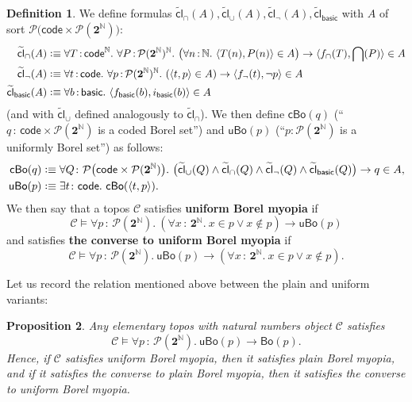 \documentclass[11pt]{amsart}
\newcommand\basic{\mathsf{basic}}
\newcommand\Bo{\mathsf{Bo}}
\newcommand\br[1]{\langle{}#1\rangle{}}
\newcommand\cBo{\mathsf{cBo}}
\newcommand\cC{\mathcal{C}}
\newcommand\cl{\mathsf{cl}}
\newcommand\code{\mathsf{code}}
\newcommand\defequiv{\mathrel{\vcenter{\baselineskip0.7ex \lineskiplimit0pt \hbox{.}\hbox{.}}} \equiv}
\newcommand\defword[1]{\textbf{#1}}
\newcommand{\N}{\mathbb{N}}
\newcommand\pbig[1]{\big({#1}\big)}
\newcommand\pow{\mathcal{P}}
\newcommand\tolon{{\,:\,}}
\newcommand\two{\mathbf{2}}
\newcommand\uBo{\mathsf{uBo}}
\newcommand\wt[1]{\widetilde{#1}}
\theoremstyle{definition}
\newtheorem{defn}{Definition}[section]
\theoremstyle{remark}
\theoremstyle{plain}
\newtheorem{propn}[defn]{Proposition}
\begin{document}
\begin{defn}
  We define formulas \( \wt{\cl}_{\cap}(A),\wt{\cl}_{\cup}(A),\wt{\cl}_{\neg}(A),\wt{\cl}_{\basic} \) with \( A \) of sort \( \pow\pbig{\code \times \pow(\two^\N)} \):
  \[
    \begin{split}
      \wt{\cl}_{\cap}(A) & \defequiv
      \forall T \tolon \code^\N.\
      \forall P \tolon \pow(\two^\N)^\N.\
      \pbig{
      \forall n \tolon \N.\
      \br{T(n), P(n)} \in A
      } \to
      \br{f_{\cap}(T), \bigcap(P)} \in A
      \\
      \wt{\cl}_{\neg}(A) & \defequiv
      \forall t \tolon \code.\
      \forall p \tolon \pow(\two^\N)^\N.\
      (
      \br{t, p} \in A
      ) \to
      \br{f_{\neg}(t), \neg p} \in A
      \\
      \wt{\cl}_{\basic}(A) & \defequiv
       \forall b \tolon \basic.\
       \br{f_{\basic}(b), i_{\basic}(b)} \in A
    \end{split}
  \]
  (and with \( \wt{\cl}_{\cup} \) defined analogously to \( \wt{\cl}_{\cap} \)).
  We then define \( \cBo(q) \) (``\( q \tolon \code \times \pow(\two^\N) \) is a coded Borel set'') and \( \uBo(p) \) (``\( p \colon \pow(\two^\N) \) is a uniformly Borel set'') as follows:
  \[
    \begin{split}
      \cBo(q) & \defequiv
      \forall Q \colon \pow\pbig{\code \times \pow(\two^\N)}.\
      \pbig{
      \wt{\cl}_\cup(Q) \wedge
      \wt{\cl}_\cap(Q) \wedge
      \wt{\cl}_\neg(Q) \wedge
      \wt{\cl}_\basic(Q)
      } \to q \in A,
      \\
      \uBo(p) & \defequiv
      \exists t \colon \code.\ \cBo(\br{t, p}).
    \end{split}
  \]
  We then say that a topos \( \cC \) satisfies \defword{uniform Borel myopia} if
  \[
    \cC \vDash
    \forall p \tolon \pow(\two^\N).\
    (\forall x \tolon \two^\N.\ x \in p \vee x \notin p) \to
    \uBo(p)
  \]
  and satisfies \defword{the converse to uniform Borel myopia} if
  \[
    \cC \vDash
    \forall p \tolon \pow(\two^\N).\
    \uBo(p) \to
    (\forall x \tolon \two^\N.\ x \in p \vee x \notin p).
  \]
\end{defn}

Let us record the relation mentioned above between the plain and uniform variants:
\begin{propn} \label{propn:uniform-implies-plain}
  Any elementary topos with natural numbers object \( \cC \) satisfies
  \[
    \cC \vDash
    \forall p \tolon \pow(\two^\N).\
    \uBo(p)
    \to
    \Bo(p).
  \]
  Hence, if \( \cC \) satisfies uniform Borel myopia, then it satisfies plain Borel myopia, and if it satisfies the converse to plain Borel myopia, then it satisfies the converse to uniform Borel myopia.
\end{propn}
\end{document}
